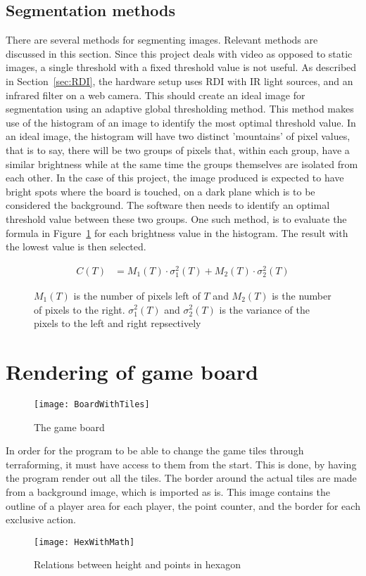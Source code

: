 \subsection{Segmentation methods}
There are several methods for segmenting images. Relevant methods are discussed in this section. Since this project deals with video as opposed to static images, a single threshold with a fixed threshold value is not useful. As described in Section~\ref{sec:RDI}, the hardware setup uses RDI with IR light sources, and an  infrared filter on a web camera. This should create an ideal image for segmentation using an adaptive global thresholding method. This method makes use of the histogram of an image to identify the most optimal threshold value\citep{Moeslund2012c4}. In an ideal image, the histogram will have two distinct 'mountains' of pixel values, that is to say, there will be two groups of pixels that, within each group, have a similar brightness while at the same time the groups themselves are isolated from each other. In the case of this project, the image produced is expected to have bright spots where the board is touched, on a dark plane which is to be considered the background. The software then needs to identify an optimal threshold value between these two groups. One such method, is to evaluate the formula in Figure~\ref{eq:otsu} for each brightness value in the histogram. The result with the lowest value is then selected.
\begin{figure}[h]
	\begin{align*}
	C(T)&=M_1(T)\cdot\sigma_1^2(T)+M_2(T)\cdot\sigma_2^2(T)
	\end{align*}
	\caption{$M_1(T)$ is the number of pixels left of $T$ and $M_2(T)$ is the number of pixels to the right. $\sigma_1^2(T)$ and $\sigma_2^2(T)$ is the variance of the pixels to the left and right repsectively \label{eq:otsu} \citep[p. 61]{moeslund_introduction_2012_chapter_5}}
\end{figure}

\section{Rendering of game board}
\begin{figure}[h!]
\centering \texttt{[image: BoardWithTiles]}
\caption{The game board \label{Fig:Board}}
\end{figure}
In order for the program to be able to change the game tiles through terraforming, it must have access to them from the start. This is done, by having the program render out all the tiles. The border around the actual tiles are made from a background image, which is imported as is. This image contains the outline of a player area for each player, the point counter, and the border for each exclusive action. 
\begin{figure}[h!]
\centering \texttt{[image: HexWithMath]}
\caption{Relations between height and points in hexagon \label{Fig:HexWithMath}}
\end{figure}

